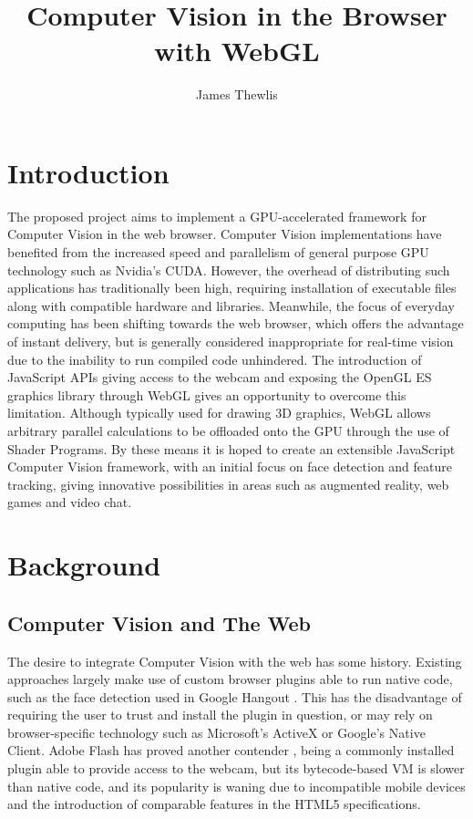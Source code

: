 \documentclass[a4paper]{article}
\begin{document}


\title{Computer Vision in the Browser with WebGL}
\author{James Thewlis}

\maketitle

\section{Introduction}
The proposed project aims to implement a GPU-accelerated framework for Computer Vision in the web browser. Computer Vision implementations have benefited from the increased speed and parallelism of general purpose GPU technology such as Nvidia's CUDA. However, the overhead of distributing such applications has traditionally been high, requiring installation of executable files along with compatible hardware and libraries. Meanwhile, the focus of everyday computing has been shifting towards the web browser, which offers the advantage of instant delivery, but is generally considered inappropriate for real-time vision due to the inability to run compiled code unhindered. The introduction of JavaScript APIs giving access to the webcam and exposing the OpenGL ES graphics library through WebGL gives an opportunity to overcome this limitation. Although typically used for drawing 3D graphics, WebGL allows arbitrary parallel calculations to be offloaded onto the GPU through the use of Shader Programs. By these means it is hoped to create an extensible JavaScript Computer Vision framework, with an initial focus on face detection and feature tracking, giving innovative possibilities in areas such as augmented reality, web games and video chat.

\section{Background}

\subsection{Computer Vision and The Web}

The desire to integrate Computer Vision with the web has some history. Existing approaches largely make use of custom browser plugins able to run native code, such as the face detection used in Google Hangout \cite{GoogleAPI}. This has the disadvantage of requiring the user to trust and install the plugin in question, or may rely on browser-specific technology such as Microsoft's ActiveX or Google's Native Client. Adobe Flash has proved another contender \cite{flashopencv}, being a commonly installed plugin able to provide access to the webcam, but its bytecode-based VM is slower than native code, and its popularity is waning due to incompatible mobile devices and the introduction of comparable features in the HTML5 specifications.
\end{document}
